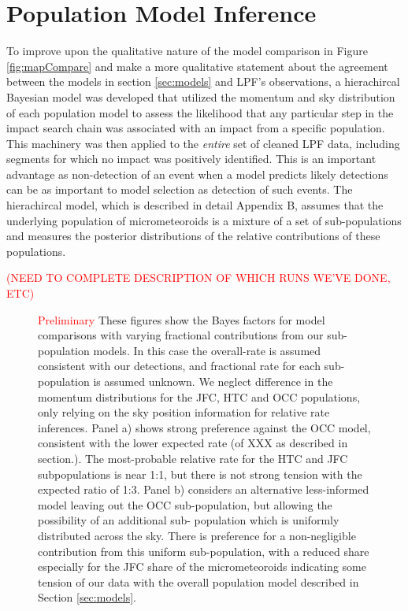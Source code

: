 \documentclass[twocolumn, trackchanges]{aastex62}
\newcommand{\red}[1]{\textcolor{red}{#1}}
\begin{document}
\section{Population Model Inference} \label{sec:model_inference}
To improve upon the qualitative nature of the model comparison in Figure \ref{fig:mapCompare} and make a more qualitative statement about the agreement between the models in section \ref{sec:models} and LPF's observations, a hierachircal Bayesian model was developed that utilized the momentum and sky distribution of each population model to assess the likelihood that any particular step in the impact search chain was associated with an impact from a specific population.  This machinery was then applied to the \emph{entire} set of cleaned LPF data, including segments for which no impact was positively identified. This is an important advantage as non-detection of an event when a model predicts likely detections can be as important to model selection as detection of such events. The hierachircal model, which is described in detail Appendix B, assumes that the underlying population of micrometeoroids is a mixture of a set of sub-populations and measures the posterior distributions of the relative contributions of these populations. 




\red{(NEED TO COMPLETE DESCRIPTION OF WHICH RUNS WE'VE DONE, ETC)}




\begin{figure}[ht!]
\caption{\red{Preliminary} These figures show the Bayes factors for model comparisons with varying fractional contributions from our sub-population models.  In this case the overall-rate is assumed consistent with our detections, and fractional rate for each sub-population is assumed unknown. We neglect difference in the momentum distributions for the JFC, HTC and OCC populations, only relying on the sky position information for relative rate inferences.  Panel a) shows strong preference against the OCC model, consistent with the lower expected rate (of XXX as described in section.). The most-probable relative rate for the HTC and JFC subpopulations is near 1:1, but there is not strong tension with the expected ratio of 1:3.  Panel b) considers an alternative less-informed model leaving out the OCC sub-population, but allowing the possibility of an additional sub- population which is uniformly distributed across the sky. There is preference for a non-negligible contribution from this uniform sub-population, with a reduced share especially for the JFC share of the micrometeoroids indicating some tension of our data with the overall population model described in Section \ref{sec:models}. \label{fig:bayes}}
\end{figure}
\end{document}
